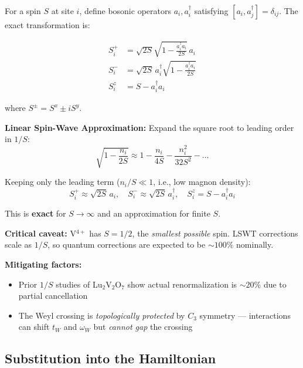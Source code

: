\documentclass[11pt,letterpaper]{article}
\begin{document}
\begin{derivation}[title={Holstein-Primakoff Mapping}]
For a spin $S$ at site $i$, define bosonic operators $a_i, a_i^\dagger$ satisfying $[a_i, a_j^\dagger] = \delta_{ij}$. The exact transformation is:

\begin{align}
S_i^+ &= \sqrt{2S} \sqrt{1 - \frac{a_i^\dagger a_i}{2S}} \, a_i \\
S_i^- &= \sqrt{2S} \, a_i^\dagger \sqrt{1 - \frac{a_i^\dagger a_i}{2S}} \\
S_i^z &= S - a_i^\dagger a_i
\end{align}

where $S^\pm = S^x \pm i S^y$.

\textbf{Linear Spin-Wave Approximation:} Expand the square root to leading order in $1/S$:
\begin{equation}
\sqrt{1 - \frac{n_i}{2S}} \approx 1 - \frac{n_i}{4S} - \frac{n_i^2}{32S^2} - \ldots
\end{equation}

Keeping only the leading term ($n_i/S \ll 1$, i.e., low magnon density):
\begin{equation}
\boxed{
S_i^+ \approx \sqrt{2S}\, a_i, \quad
S_i^- \approx \sqrt{2S}\, a_i^\dagger, \quad
S_i^z = S - a_i^\dagger a_i
}
\end{equation}

This is \textbf{exact} for $S \to \infty$ and an approximation for finite $S$.
\end{derivation}

\begin{assumption}[title={Validity for $S = 1/2$}]
\textbf{Critical caveat:} V$^{4+}$ has $S = 1/2$, the \emph{smallest possible} spin. LSWT corrections scale as $1/S$, so quantum corrections are expected to be $\sim 100\%$ nominally.

\textbf{Mitigating factors:}
\begin{itemize}
    \item Prior $1/S$ studies of Lu$_2$V$_2$O$_7$ show actual renormalization is $\sim 20\%$ due to partial cancellation
    \item The Weyl crossing is \emph{topologically protected} by $C_3$ symmetry --- interactions can shift $t_W$ and $\omega_W$ but \emph{cannot gap} the crossing
\end{itemize}
\end{assumption}

\subsection{Substitution into the Hamiltonian}
\end{document}
